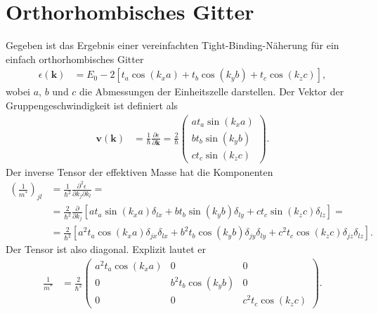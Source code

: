 \documentclass[english, parskip=full]{scrartcl}
\newcommand{\intx}{}
\newcommand{\kla}{}
\newcommand{\klam}{}
\renewcommand{\i}{\text{i}}
\newcommand{\e}{\text{e}}
\begin{document}

\section{Orthorhombisches Gitter}
Gegeben ist das Ergebnis einer vereinfachten Tight-Binding-Näherung für ein einfach orthorhombisches Gitter
\begin{align}
\epsilon (\textbf{k}) &= E_0 - 2\klam\left[ t_a\cos (k_xa) + t_b\cos(k_yb) + t_c\cos(k_zc) \right],
\end{align}
wobei $a$, $b$ und $c$ die Abmessungen der Einheitszelle darstellen.
Der Vektor der Gruppengeschwindigkeit ist definiert als
\begin{align}
\textbf{v}(\textbf{k}) &= \frac{1}{\hbar} \frac{\partial \epsilon}{\partial \textbf{k}} = \frac{2}{\hbar} \begin{pmatrix}
at_a \sin(k_xa) \\ bt_b \sin(k_yb) \\ ct_c \sin(k_zc)
\end{pmatrix}.
\end{align}
Der inverse Tensor der effektiven Masse hat die Komponenten
\begin{align}
\kla\left( \frac{1}{m^\ast} \right)_{jl} &= \frac{1}{\hbar^2} \frac{\partial^2\epsilon}{\partial k_j\partial k_l} = \\
&= \frac{2}{\hbar^2} \frac{\partial}{\partial k_j} \klam\left[ at_a \sin(k_xa) \delta_{lx} + bt_b \sin(k_yb) \delta_{ly} + ct_c \sin(k_zc) \delta_{lz} \right] = \\
&= \frac{2}{\hbar^2} \klam\left[ a^2t_a\cos (k_xa) \delta_{jx}\delta_{lx} + b^2t_b\cos(k_yb) \delta_{jy}\delta_{ly} + c^2t_c\cos(k_zc) \delta_{jz}\delta_{lz} \right].
\end{align}
Der Tensor ist also diagonal.
Explizit lautet er
\begin{align}
\frac{1}{m^\ast} &= \frac{2}{\hbar^2} \begin{pmatrix}
a^2t_a\cos (k_xa) & 0 & 0\\
0& b^2t_b\cos(k_yb) &0 \\
0&0& c^2t_c\cos(k_zc)
\end{pmatrix}.
\end{align}
\end{document}
